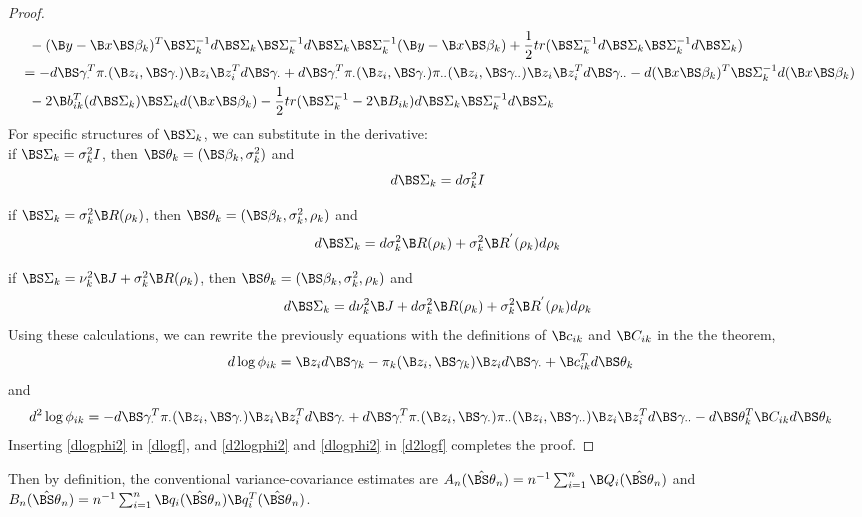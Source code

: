 \begin{proof}
\begin{align}
&\;\;-(\B y-\B x\BS \beta_{k})^{T}\BS\Sigma_{k}^{-1}d\BS\Sigma_{k}\BS\Sigma_{k}^{-1}d\BS\Sigma_{k}\BS\Sigma_{k}^{-1}(\B y-\B x\BS\beta_{k})+\frac{1}{2}tr(\BS\Sigma_{k}^{-1}d\BS\Sigma_{k}\BS\Sigma_{k}^{-1}d\BS\Sigma_{k})\nonumber\\
&=-d\BS\gamma_{\cdot}^{T}\pi_{\cdot}(\B z_{i},\BS\gamma_{\cdot})\B z_{i}\B z_{i}^{T}d\BS\gamma_{\cdot}+d\BS\gamma_{\cdot}^{T}\pi_{\cdot}(\B z_{i},\BS\gamma_{\cdot})\pi_{\cdot\cdot}(\B z_{i},\BS\gamma_{\cdot\cdot})\B z_{i}\B z_{i}^{T}d\BS\gamma_{\cdot\cdot}-d(\B x\BS \beta_{k})^{T}\BS\Sigma_{k}^{-1}d(\B x\BS \beta_{k})\nonumber\\
&\;\;-2\B b_{ik}^{T}(d\BS\Sigma_{k})\BS\Sigma_{k}d(\B x\BS\beta_{k})-\frac{1}{2}tr(\BS\Sigma_{k}^{-1}-2\B B_{ik})d\BS\Sigma_{k}\BS\Sigma_{k}^{-1}d\BS\Sigma_{k}\nonumber
\end{align}
For specific structures of $\BS\Sigma_{k}$, we can substitute in the derivative:\\

if $\BS\Sigma_{k}=\sigma_{k}^{2}I$, then $\BS\theta_{k}=(\BS\beta_{k},\sigma^{2}_{k})$ and
$$d\BS\Sigma_{k}=d\sigma_{k}^{2}I$$

if $\BS\Sigma_{k}=\sigma_{k}^{2}\B R(\rho_{k})$, then $\BS\theta_{k}=(\BS\beta_{k},\sigma^{2}_{k},\rho_{k})$ and
$$d\BS\Sigma_{k}=d\sigma_{k}^{2}\B R(\rho_{k}) +\sigma_{k}^{2}\B R^{'}(\rho_{k})d\rho_{k}$$

if $\BS\Sigma_{k}=\nu_{k}^{2}\B J+\sigma_{k}^{2}\B R(\rho_{k})$, then $\BS\theta_{k}=(\BS\beta_{k},\sigma^{2}_{k},\rho_{k})$ and
$$d\BS\Sigma_{k}=d\nu_{k}^{2}\B J + d\sigma_{k}^{2}\B R(\rho_{k}) +\sigma_{k}^{2}\B R^{'}(\rho_{k})d\rho_{k}$$
Using these calculations, we can rewrite the previously equations with the definitions of $\B c_{ik}$ and $\B C_{ik}$ in the the theorem,
\begin{align}\label{dlogphi2}
d\log \phi_{ik}&=\B z_{i} d\BS \gamma_{k} -\pi_{k}(\B z_{i},\BS\gamma_k)\B z_{i}d\BS\gamma_{\cdot}+\B c^{T}_{ik}d\BS\theta_{k} 
\end{align}
and
\begin{align}\label{d2logphi2}
d^{2}\log \phi_{ik}
&=-d\BS\gamma_{\cdot}^{T}\pi_{\cdot}(\B z_{i},\BS\gamma_{\cdot})\B z_{i}\B z_{i}^{T}d\BS\gamma_{\cdot}+d\BS\gamma_{\cdot}^{T}\pi_{\cdot}(\B z_{i},\BS\gamma_{\cdot})\pi_{\cdot\cdot}(\B z_{i},\BS\gamma_{\cdot\cdot})\B z_{i}\B z_{i}^{T}d\BS\gamma_{\cdot\cdot}-d\BS\theta_{k}^{T}\B C_{ik}d\BS\theta_{k}
\end{align}
Inserting \eqref{dlogphi2} in \eqref{dlogf}, and \eqref{d2logphi2} and \eqref{dlogphi2} in \eqref{d2logf} completes the proof.
\end{proof}
Then by definition, the conventional variance-covariance estimates are $A_{n}(\hat{\BS\theta}_{n})=n^{-1}\sum_{i=1}^{n}\B Q_{i}(\hat{\BS \theta}_{n})$ and $B_{n}(\hat{\BS\theta}_{n})=n^{-1}\sum_{i=1}^{n}\B q_{i}(\hat{\BS\theta}_{n})\B q_{i}^{T}(\hat{\BS\theta}_{n})$. 


